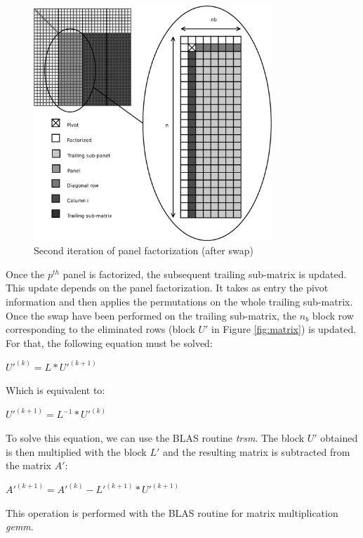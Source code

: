 \begin{figure}[!ht]
\centering
\includegraphics[width=0.8\textwidth]{figures/panel.pdf}
\caption{Second iteration of panel factorization (after swap)\label{fig:panel}}
\end{figure}

Once the $p^{th}$ panel is factorized, the subsequent trailing sub-matrix is updated. This update depends on the panel factorization. It takes as entry the pivot information and then applies the permutations on the whole trailing sub-matrix. Once the swap have been performed on the trailing sub-matrix, the $n_b$ block row corresponding to the eliminated rows (block $U'$ in Figure \ref{fig:matrix}) is updated. For that, the following equation must be solved:
\begin{center}
$U'^{(k)} = L*U'^{(k+1)}$
\end{center}
Which is equivalent to:
\begin{center}
$U'^{(k+1)} = L^{-1}*U'^{(k)}$
\end{center}
To solve this equation, we can use the BLAS routine \textit{trsm}. The block $U'$ obtained is then multiplied with the block $L'$ and the resulting matrix is subtracted from the matrix $A'$:
\begin{center}
$A'^{(k+1)} = A'^{(k)} - L'^{(k+1)}*U'^{(k+1)}$
\end{center}
This operation is performed with the BLAS routine for matrix multiplication \textit{gemm}.


